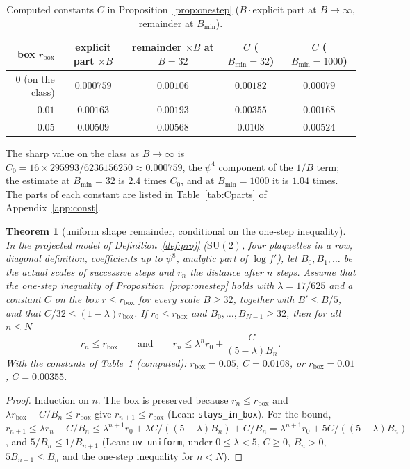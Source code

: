 \documentclass[11pt,a4paper]{article}
\newtheorem{theorem}{Theorem}
\theoremstyle{definition}
\theoremstyle{remark}
\newcommand{\SU}{\mathrm{SU}(2)}
\newcommand{\code}[1]{\texttt{#1}}
\begin{document}
\begin{table}[h]
\centering\small
\caption{Computed constants $C$ in Proposition~\ref{prop:onestep} ($B\cdot$explicit part at $B\to\infty$, remainder at $B_{\min}$).}\label{tab:C}
\begin{tabular}{@{}rcccc@{}}
\toprule
box $r_{\mathrm{box}}$ & explicit part $\times B$ & remainder $\times B$ at $B=32$ & $C$ ($B_{\min}=32$) & $C$ ($B_{\min}=1000$)\\ \midrule
$0$ (on the class) & $0.000759$ & $0.00106$ & $0.00182$ & $0.00079$\\
$0.01$ & $0.00163$ & $0.00193$ & $0.00355$ & $0.00168$\\
$0.05$ & $0.00509$ & $0.00568$ & $0.0108$ & $0.00524$\\
\bottomrule
\end{tabular}
\end{table}

The sharp value on the class as $B\to\infty$ is $C_0=16\times295993/6236156250\approx0.000759$, the $\psi^4$ component of the $1/B$ term; the estimate at $B_{\min}=32$ is $2.4$ times $C_0$, and at $B_{\min}=1000$ it is $1.04$ times.
The parts of each constant are listed in Table~\ref{tab:Cparts} of Appendix~\ref{app:const}.

\begin{theorem}[uniform shape remainder, conditional on the one-step inequality]\label{thm:U}
In the projected model of Definition~\ref{def:proj} ($\SU$, four plaquettes in a row, diagonal definition, coefficients up to $\psi^8$, analytic part of $\log f'$), let $B_0,B_1,\dots$ be the actual scales of successive steps and $r_n$ the distance after $n$ steps.
Assume that the one-step inequality of Proposition~\ref{prop:onestep} holds with $\lambda=17/625$ and a constant $C$ on the box $r\le r_{\mathrm{box}}$ for every scale $B\ge32$, together with $B'\le B/5$, and that $C/32\le(1-\lambda)r_{\mathrm{box}}$.
If $r_0\le r_{\mathrm{box}}$ and $B_0,\dots,B_{N-1}\ge32$, then for all $n\le N$
\[
r_n\le r_{\mathrm{box}}\qquad\text{and}\qquad r_n\le\lambda^n r_0+\frac{C}{(5-\lambda)B_n}.
\]
With the constants of Table~\ref{tab:C} (computed): $r_{\mathrm{box}}=0.05$, $C=0.0108$, or $r_{\mathrm{box}}=0.01$, $C=0.00355$.
\end{theorem}

\begin{proof}
Induction on $n$.
The box is preserved because $r_n\le r_{\mathrm{box}}$ and $\lambda r_{\mathrm{box}}+C/B_n\le r_{\mathrm{box}}$ give $r_{n+1}\le r_{\mathrm{box}}$ (Lean: \code{stays\_in\_box}).
For the bound, $r_{n+1}\le\lambda r_n+C/B_n\le\lambda^{n+1}r_0+\lambda C/((5-\lambda)B_n)+C/B_n=\lambda^{n+1}r_0+5C/((5-\lambda)B_n)$, and $5/B_n\le1/B_{n+1}$ (Lean: \code{uv\_uniform}, under $0\le\lambda<5$, $C\ge0$, $B_n>0$, $5B_{n+1}\le B_n$ and the one-step inequality for $n<N$).
\end{proof}
\end{document}
